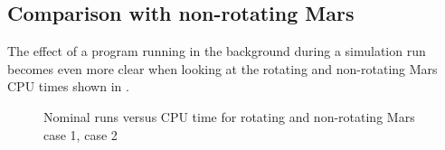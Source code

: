 %



\subsection{Comparison with non-rotating Mars}
\label{subsec:timeCompNotRot}
The effect of a program running in the background during a simulation run becomes even more clear when looking at the rotating and non-rotating Mars CPU times shown in . 


%
%


\begin{figure}[H]
\centering
{} 
\caption{Nominal runs versus CPU time for rotating and non-rotating Mars \protect{} case 1,  \protect{} case 2 } 
\label{fig:multiRunVsCPUcase1combinedSmall} 
\end{figure} 

